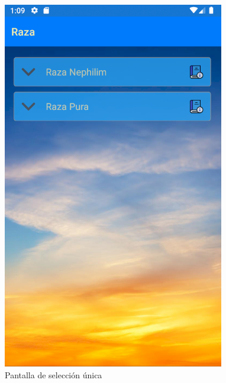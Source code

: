 \begin{figure}[H]
    \centering
    \includegraphics[scale=0.7]{Figures/Capturas/SeleccionUnicaGrupoCerrado.png}
    \caption{Pantalla de selección única}
    \label{SeleccionUnicaGrupoCerrado}    
\end{figure}
